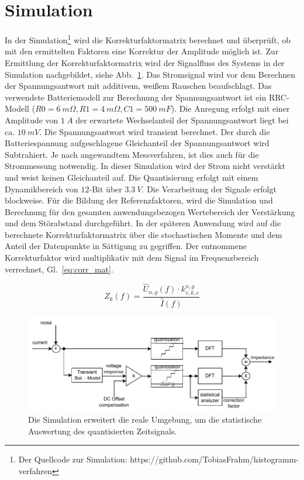 \section{Simulation}

In der Simulation\footnote[2]{Der Quellcode zur Simulation: https://github.com/TobiasFrahm/histogramm-verfahren} wird die Korrekturfaktormatrix berechnet und überprüft, ob mit den ermittelten Faktoren eine Korrektur der Amplitude möglich ist. Zur Ermittlung der Korrekturfaktormatrix wird der Signalfluss des Systems in der Simulation nachgebildet, siehe Abb.~\ref{fig:Simulation}. Das Stromsignal wird vor dem Berechnen der Spannungsantwort mit additivem, weißem Rauschen beaufschlagt. Das verwendete Batteriemodell zur Berechnung der Spannungsantwort ist ein RRC-Modell ($R0 = \SI{6}{m\Omega}, R1=\SI{4}{m\Omega}, C1=\SI{500}{mF}$). Die Anregung erfolgt mit einer Amplitude von $\SI{1}{A}$ der erwartete Wechselanteil der Spannungsantwort liegt bei ca. $\SI{10}{mV}$. Die Spannungsantwort wird transient berechnet. Der durch die Batteriespannung aufgeschlagene Gleichanteil der Spannungsantwort wird Subtrahiert. Je nach angewandtem Messverfahren, ist dies auch für die Strommessung notwendig. In dieser Simulation wird der Strom nicht verstärkt und weist keinen Gleichanteil auf. Die Quantisierung erfolgt mit einem Dynamikbereich von $12$-Bit über  $\SI{3.3}{V}$. Die Verarbeitung der Signale erfolgt blockweise. Für die Bildung der Referenzfaktoren, wird die Simulation und Berechnung für den gesamten anwendungsbezogen Wertebereich der Verstärkung und dem Störabstand durchgeführt. In der späteren Anwendung wird auf die berechnete Korrekturfaktormatrix über die stochastischen Momente und dem Anteil der Datenpunkte in Sättigung zu gegriffen. Der entnommene Korrekturfaktor wird multiplikativ mit dem Signal im Frequenzbereich verrechnet, Gl.~\eqref{eq:corr_mat}. 

\begin{equation}
	\label{eq:corr_mat}
	Z_k(f) = \frac{\hat{U}_{n,g}(f) \cdot k_{v,k,c}^{n,g}}{\hat{I}(f)}
\end{equation}

\begin{figure}[h!] 
	\centering 
	\includegraphics[width=1\columnwidth]{../img/histo_sim.pdf}
	\caption{Die Simulation erweitert die reale Umgebung, um die statistische Auswertung des quantisierten Zeitsignals.}
	\label{fig:Simulation}
\end{figure}

